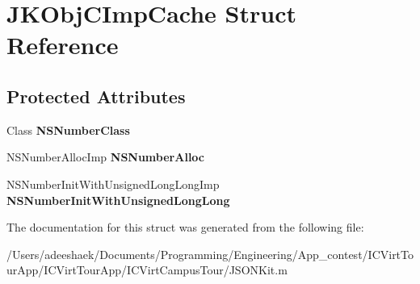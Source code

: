 \hypertarget{struct_j_k_obj_c_imp_cache}{\section{J\-K\-Obj\-C\-Imp\-Cache Struct Reference}
\label{struct_j_k_obj_c_imp_cache}
}
\subsection*{Protected Attributes}
\begin{DoxyCompactItemize}
\item 
\hypertarget{struct_j_k_obj_c_imp_cache_a762d244148bac2ecb30ff6de022d265f}{Class {\bfseries N\-S\-Number\-Class}}\label{struct_j_k_obj_c_imp_cache_a762d244148bac2ecb30ff6de022d265f}

\item 
\hypertarget{struct_j_k_obj_c_imp_cache_a15652542f96a895c1ad87402195fbf73}{N\-S\-Number\-Alloc\-Imp {\bfseries N\-S\-Number\-Alloc}}\label{struct_j_k_obj_c_imp_cache_a15652542f96a895c1ad87402195fbf73}

\item 
\hypertarget{struct_j_k_obj_c_imp_cache_ac11fd89e1d1ef655a9edabf1abcefeb7}{N\-S\-Number\-Init\-With\-Unsigned\-Long\-Long\-Imp {\bfseries N\-S\-Number\-Init\-With\-Unsigned\-Long\-Long}}\label{struct_j_k_obj_c_imp_cache_ac11fd89e1d1ef655a9edabf1abcefeb7}

\end{DoxyCompactItemize}


The documentation for this struct was generated from the following file\-:\begin{DoxyCompactItemize}
\item 
/\-Users/adeeshaek/\-Documents/\-Programming/\-Engineering/\-App\-\_\-contest/\-I\-C\-Virt\-Tour\-App/\-I\-C\-Virt\-Tour\-App/\-I\-C\-Virt\-Campus\-Tour/J\-S\-O\-N\-Kit.\-m\end{DoxyCompactItemize}
